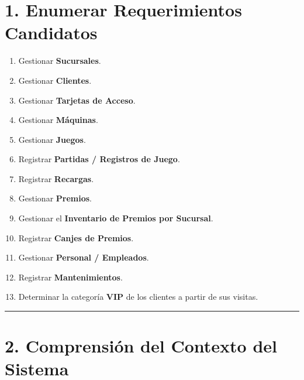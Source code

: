 \documentclass[12pt,a4paper]{article}
\begin{document}
\section*{1. Enumerar Requerimientos Candidatos}

\begin{enumerate}
    \item Gestionar \textbf{Sucursales}.
    \item Gestionar \textbf{Clientes}.
    \item Gestionar \textbf{Tarjetas de Acceso}.
    \item Gestionar \textbf{Máquinas}.
    \item Gestionar \textbf{Juegos}.
    \item Registrar \textbf{Partidas / Registros de Juego}.
    \item Registrar \textbf{Recargas}.
    \item Gestionar \textbf{Premios}.
    \item Gestionar el \textbf{Inventario de Premios por Sucursal}.
    \item Registrar \textbf{Canjes de Premios}.
    \item Gestionar \textbf{Personal / Empleados}.
    \item Registrar \textbf{Mantenimientos}.
    \item Determinar la categoría \textbf{VIP} de los clientes a partir de sus visitas.
\end{enumerate}

\vspace{1em}
\noindent\rule{\textwidth}{0.4pt}
\vspace{1em}

\section*{2. Comprensión del Contexto del Sistema}
\end{document}
